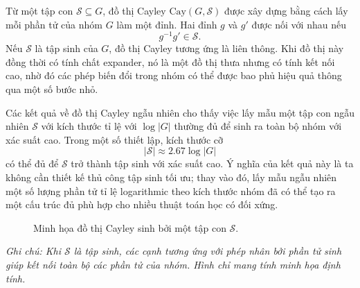 Từ một tập con $\mathcal{S} \subseteq G$, đồ thị Cayley $\mathrm{Cay}(G,\mathcal{S})$ được xây dựng bằng cách lấy mỗi phần tử của nhóm $G$ làm một đỉnh. Hai đỉnh $g$ và $g'$ được nối với nhau nếu
\begin{equation}
    g^{-1}g' \in \mathcal{S}.
    \label{eq:cayley-edge}
\end{equation}
Nếu $\mathcal{S}$ là tập sinh của $G$, đồ thị Cayley tương ứng là liên thông. Khi đồ thị này đồng thời có tính chất expander, nó là một đồ thị thưa nhưng có tính kết nối cao, nhờ đó các phép biến đổi trong nhóm có thể được bao phủ hiệu quả thông qua một số bước nhỏ.

Các kết quả về đồ thị Cayley ngẫu nhiên cho thấy việc lấy mẫu một tập con ngẫu nhiên $\mathcal{S}$ với kích thước tỉ lệ với $\log |G|$ thường đủ để sinh ra toàn bộ nhóm với xác suất cao. Trong một số thiết lập, kích thước cỡ
\begin{equation}
    |\mathcal{S}| \approx 2.67 \log |G|
    \label{eq:random-generator-size}
\end{equation}
có thể đủ để $\mathcal{S}$ trở thành tập sinh với xác suất cao. Ý nghĩa của kết quả này là ta không cần thiết kế thủ công tập sinh tối ưu; thay vào đó, lấy mẫu ngẫu nhiên một số lượng phần tử tỉ lệ logarithmic theo kích thước nhóm đã có thể tạo ra một cấu trúc đủ phù hợp cho nhiều thuật toán học có đối xứng.

\begin{figure}[H]
    \centering
    
    \caption[Minh họa đồ thị Cayley sinh bởi một tập con $\mathcal{S}$]{Minh họa đồ thị Cayley sinh bởi một tập con $\mathcal{S}$.}
    \label{fig:cayley-expander}
    
    \vspace{0.15cm}
    \begin{minipage}{0.9\linewidth}
        \centering
    \end{minipage}
\end{figure}
\vspace{-2.0em}
\noindent\textit{Ghi chú: Khi $\mathcal{S}$ là tập sinh, các cạnh tương ứng với phép nhân bởi phần tử sinh giúp kết nối toàn bộ các phần tử của nhóm. Hình chỉ mang tính minh họa định tính.}

